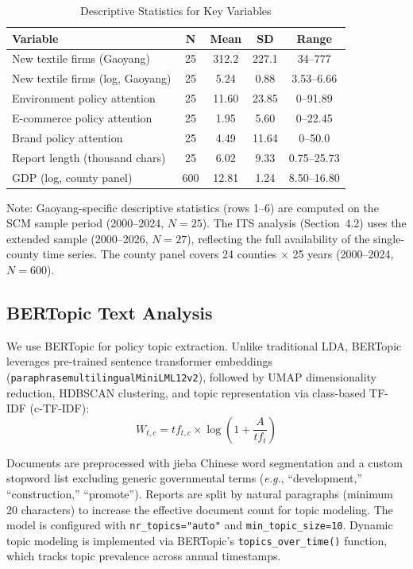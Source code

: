 \documentclass[sustainability,article,submit,moreauthors,pdftex]{mdpi}
\begin{document}
\begin{table}[htbp]
\centering
\caption{Descriptive Statistics for Key Variables}
\label{tab:desc}
\begin{tabularx}{\textwidth}{l c c c c}
\toprule
Variable & N & Mean & SD & Range \\
\midrule
New textile firms (Gaoyang) & 25 & 312.2 & 227.1 & 34--777 \\
New textile firms (log, Gaoyang) & 25 & 5.24 & 0.88 & 3.53--6.66 \\
Environment policy attention & 25 & 11.60 & 23.85 & 0--91.89 \\
E-commerce policy attention & 25 & 1.95 & 5.60 & 0--22.45 \\
Brand policy attention & 25 & 4.49 & 11.64 & 0--50.0 \\
Report length (thousand chars) & 25 & 6.02 & 9.33 & 0.75--25.73 \\
GDP (log, county panel) & 600 & 12.81 & 1.24 & 8.50--16.80 \\
\bottomrule
\end{tabularx}

\vspace{2pt}
{\footnotesize Note: Gaoyang-specific descriptive statistics (rows 1--6) are computed on the SCM sample period (2000--2024, $N=25$). The ITS analysis (Section~4.2) uses the extended sample (2000--2026, $N=27$), reflecting the full availability of the single-county time series. The county panel covers 24 counties $\times$ 25 years (2000--2024, $N=600$).}

\end{table}

\subsection{BERTopic Text Analysis}
We use BERTopic \citep{Grootendorst2022} for policy topic extraction. Unlike traditional LDA, BERTopic leverages pre-trained sentence transformer embeddings (\texttt{paraphrase\-multilingual\-MiniLM\-L12\-v2}), followed by UMAP dimensionality reduction, HDBSCAN clustering, and topic representation via class-based TF-IDF (c-TF-IDF):
\begin{equation}
    W_{t,c} = tf_{t,c} \times \log\left(1 + \frac{A}{tf_t}\right)
\end{equation}

Documents are preprocessed with jieba Chinese word segmentation and a custom stopword list excluding generic governmental terms (\textit{e.g.}, ``development,'' ``construction,'' ``promote''). Reports are split by natural paragraphs (minimum 20 characters) to increase the effective document count for topic modeling. The model is configured with \texttt{nr\_topics="auto"} and \texttt{min\_topic\_size=10}. Dynamic topic modeling is implemented via BERTopic's \texttt{topics\_over\_time()} function, which tracks topic prevalence across annual timestamps.
\end{document}

